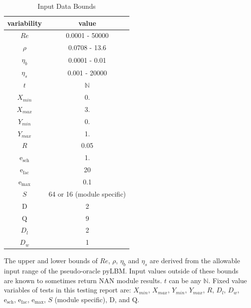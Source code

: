 \documentclass[12pt, titlepage]{article}
\begin{document}
\begin{table}[!h]
\begin{center}
\begin{tabular}{| c | c |}
\hline
\textbf{variability} & \textbf{value}\\
\hline
$Re$& 0.0001 - 50000\\
\hline
$\rho$ & 0.0708 - 13.6\\
\hline
$\eta_b$ & 0.0001 - 0.01\\
\hline
$\eta_s$ & 0.001 - 20000\\
\hline
$t$ & $\mathbb{N}$\\
\hline
$X_{min}$ & 0.\\
\hline
$X_{max}$ & 3.\\
\hline
$Y_{min}$ & 0.\\
\hline
$Y_{max}$ & 1.\\
\hline
$R$ & 0.05\\
\hline
$\mathrm{e_{sch}}$ & 1.\\
\hline
$\mathrm{e_{fac}}$ & 20\\
\hline
$\mathrm{e_{max}}$ & 0.1\\
\hline
$S$ & 64 or 16 (module specific)\\
\hline
$\mathrm{D}$ & 2\\
\hline
$\mathrm{Q}$ & 9\\
\hline
$D_{l}$ & 2\\
\hline
$D_{w}$ & 1\\
\hline
\end{tabular}
\caption{Input Data Bounds}
\label{table:inputdatabounds}
\end{center}
\end{table}


\noindent The upper and lower bounds of $Re$, $\rho$, $\eta_b$ and $\eta_s$ are
derived from the allowable input range of the pseudo-oracle pyLBM. Input values
outside of these bounds are known to sometimes return NAN module results. $t$
can be any $\mathbb{N}$. Fixed value variables of tests in this testing report
are: $X_{min}$, $X_{max}$, $Y_{min}$, $Y_{max}$, $R$, $D_{l}$, $D_{w}$,
$\mathrm{e_{sch}}$, $\mathrm{e_{fac}}$, $\mathrm{e_{max}}$, $S$ (module
specific), $\mathrm{D}$, and $\mathrm{Q}$.
\end{document}
